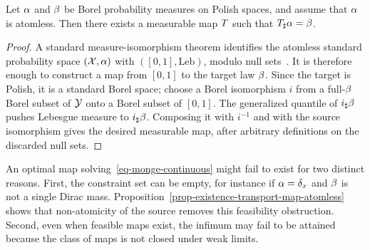 \begin{prop}\label{prop-existence-transport-map-atomless}
	Let $\alpha$ and $\beta$ be Borel probability measures on Polish spaces, and assume that $\alpha$ is atomless. Then there exists a measurable map $T$ such that $T_\sharp\alpha=\beta$.
\end{prop}
\begin{proof}
	A standard measure-isomorphism theorem identifies the atomless standard probability space $(\mathcal{X},\alpha)$ with $([0,1],\mathrm{Leb})$, modulo null sets~\cite{bogachev2007measure}. It is therefore enough to construct a map from $[0,1]$ to the target law $\beta$. Since the target is Polish, it is a standard Borel space; choose a Borel isomorphism $i$ from a full-$\beta$ Borel subset of $\mathcal{Y}$ onto a Borel subset of $[0,1]$. The generalized quantile of $i_\sharp\beta$ pushes Lebesgue measure to $i_\sharp\beta$. Composing it with $i^{-1}$ and with the source isomorphism gives the desired measurable map, after arbitrary definitions on the discarded null sets.
\end{proof}

\begin{rem}
	An optimal map solving~\eqref{eq-monge-continuous} might fail to exist for two distinct reasons. First, the constraint set can be empty, for instance if $\alpha=\delta_x$ and $\beta$ is not a single Dirac mass. Proposition~\ref{prop-existence-transport-map-atomless} shows that non-atomicity of the source removes this feasibility obstruction. Second, even when feasible maps exist, the infimum may fail to be attained because the class of maps is not closed under weak limits.
\end{rem}

